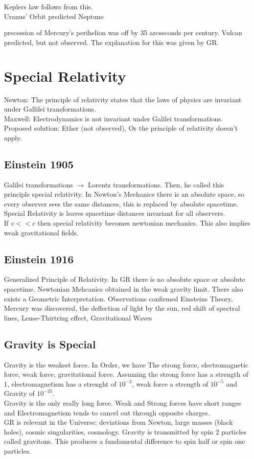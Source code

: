 Keplers law follows from this.\\
Uranus' Orbit predicted Neptune

precession of Mercury's perihelion was off by 35 arcseconds per century. Vulcan predicted, but not observed. The explanation for this was given by GR.

\section{Special Relativity}
Newton: The principle of relativity states that the laws of physics are invariant under Gallilei transformations.\\
Maxwell: Electrodynamics is not invariant under Galilei transformations. Proposed solution: Ether (not observed), Or the principle of relativity doesn't apply.\\

\subsection{Einstein 1905}
Galilei transformations $\longrightarrow$ Lorentz transformations. Then, he called this principle special relativity. In Newton's Mechanics there is an absolute space, so every observer sees the same distances, this is replaced by absolute spacetime. Special Relativity is leaves spacetime distances invariant for all observers.\\
If $v << c$ then special relativity becomes newtonian mechanics. This also implies weak gravitational fields.

\subsection{Einstein 1916}
Generalized Principle of Relativity. In GR there is no absolute space or absolute spacetime. Newtonian Mehcanics obtained in the weak gravity limit. There also exists a Geometric Interpretation. Observations confirmed Einsteins Theory, Mercury was discovered, the deflection of light by the sun, red shift of spectral lines, Lense-Thirtring effect, Gravitational Waves

\subsection{Gravity is Special}
Gravity is the weakest force. In Order, we have The strong force, electromagnetic force, weak force, gravitational force. Assuming the strong force has a strength of 1, electromagnetism has a strenght of $10^{-2}$, weak force a strength of $10^{-5}$ and Gravity of $10^{-35}$.\\
Gravity is the only really long force. Weak and Strong forces have short ranges and Electromagnetism tends to cancel out through opposite charges.\\
GR is relevant in the Universe; deviations from Newton, large masses (black holes), cosmic singularities, cosmology. Gravity is transmitted by spin 2 particles called gravitons. This produces a fundamental difference to spin half or spin one particles. 


